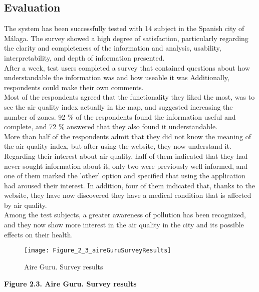 \subsection*{Evaluation}

The system has been successfully tested with 14 subject in the Spanish city of Málaga.
The survey showed a high degree of satisfaction, particularly regarding the clarity and completeness of the information and analysis,
usability, interpretability, and depth of information presented.\\

After a week, test users completed a survey that contained questions about how understandable the information was and how useable it was
Additionally, respondents could make their own comments.\\

Most of the respondents agreed that the functionality they liked the most, was to see the air quality index actually in the map, and suggested increasing the number of zones.
92 \% of the respondents found the information useful and complete, and 72 \% answered that they also found it understandable.\\

More than half of the respondents admit that they did not know the meaning of the air quality index, but after using the website, they now understand it.\\

Regarding their interest about air quality, half of them indicated that they had never sought information about it,
only two were previously well informed, and one of them marked the 'other' option and specified that using the application had aroused their interest.
In addition, four of them indicated that, thanks to the website, they have now discovered they have a medical condition that is affected by air quality.\\

Among the test subjects, a greater awareness of pollution has been recognized, and they now show more interest in the air quality in the city and its possible effects on their health.

\begin{figure}[ht]
   \centering
   \texttt{[image: Figure\_2\_3\_aireGuruSurveyResults]}
   \caption{Aire Guru. Survey results}
\end{figure}

\begin{center}
   \bf Figure 2.3. Aire Guru. Survey results\\
\end{center}